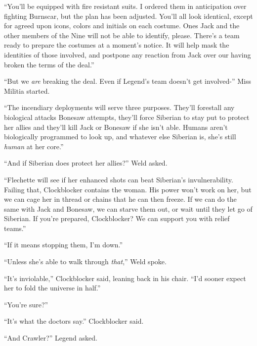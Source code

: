 ``You'll be equipped with fire resistant suits.  I ordered them in anticipation over fighting Burnscar, but the plan has been adjusted.  You'll all look identical, except for agreed upon icons, colors and initials on each costume.  Ones Jack and the other members of the Nine will not be able to identify, please.  There's a team ready to prepare the costumes at a moment's notice.  It will help mask the identities of those involved, and postpone any reaction from Jack over our having broken the terms of the deal.''



``But we \emph{are} breaking the deal.  Even if Legend's team doesn't get involved-'' Miss Militia started.



``The incendiary deployments will serve three purposes.  They'll forestall any biological attacks Bonesaw attempts, they'll force Siberian to stay put to protect her allies and they'll kill Jack or Bonesaw if she isn't able.  Humans aren't biologically programmed to look up, and whatever else Siberian is, she's still \emph{human} at her core.''



``And if Siberian does protect her allies?'' Weld asked.



``Flechette will see if her enhanced shots can beat Siberian's invulnerability.  Failing that, Clockblocker contains the woman.  His power won't work on her, but we can cage her in thread or chains that he can then freeze.  If we can do the same with Jack and Bonesaw, we can starve them out, or wait until they let go of Siberian.  If you're prepared, Clockblocker?  We can support you with relief teams.''



``If it means stopping them, I'm down.''



``Unless she's able to walk through \emph{that},'' Weld spoke.



``It's inviolable,'' Clockblocker said, leaning back in his chair.  ``I'd sooner expect her to fold the universe in half.''



``You're sure?''



``It's what the doctors say.''  Clockblocker said.



``And Crawler?'' Legend asked.



